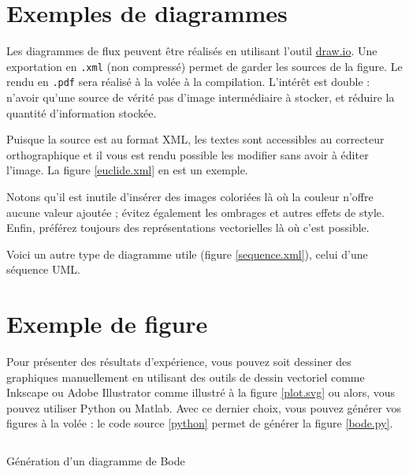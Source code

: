 \documentclass[
    iai, %
    eai, %
]{heig-tb}
\begin{document}
\section{Exemples de diagrammes}

Les diagrammes de flux peuvent être réalisés en utilisant l'outil \href{https://app.diagrams.net/}{draw.io}. Une exportation en \texttt{.xml} (non compressé) permet de garder les sources de la figure. Le rendu en \texttt{.pdf} sera réalisé à la volée à la compilation. L'intérêt est double : n'avoir qu'une source de vérité \cad pas d'image intermédiaire à stocker, et réduire la quantité d'information stockée.

Puisque la source est au format XML, les textes sont accessibles au correcteur orthographique et il vous est rendu possible les modifier sans avoir à éditer l'image. La figure \ref{euclide.xml} en est un exemple.



Notons qu'il est inutile d'insérer des images coloriées là où la couleur n'offre aucune valeur ajoutée ; évitez également les ombrages et autres effets de style. Enfin, préférez toujours des représentations vectorielles là où c'est possible.

Voici un autre type de diagramme utile (figure \ref{sequence.xml}), celui d'une séquence UML.


\section{Exemple de figure}

Pour présenter des résultats d'expérience, vous pouvez soit dessiner des graphiques manuellement en utilisant des outils de dessin vectoriel comme Inkscape ou Adobe Illustrator comme illustré à la figure \ref{plot.svg} ou alors, vous pouvez utiliser Python ou Matlab. Avec ce dernier choix, vous pouvez générer vos figures à la volée : le code source \ref{python} permet de générer la figure \ref{bode.py}.


\begin{listing}[h]
  \inputminted[breaklines]{php}{assets/figures/php.php}
  \caption{Génération d'un diagramme de Bode \label{python}}
\end{listing}


\end{document}
